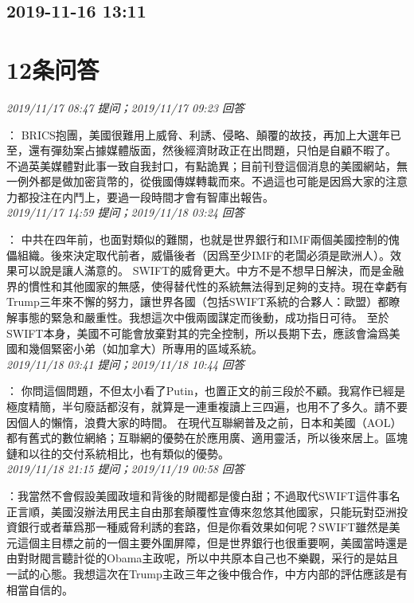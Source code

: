 \documentclass[twocolumn]{ctexart}
\begin{document}
\subsection{2019-11-16 13:11}


\section{12条问答}

\textit{\hfill\noindent\small 2019/11/17 08:47 提问；2019/11/17 09:23 回答}

：
BRICS抱團，美國很難用上威脅、利誘、侵略、顛覆的故技，再加上大選年已至，還有彈劾案占據媒體版面，然後經濟財政正在出問題，只怕是自顧不暇了。 
不過英美媒體對此事一致自我封口，有點詭異；目前刊登這個消息的美國網站，無一例外都是做加密貨幣的，從俄國傳媒轉載而來。不過這也可能是因爲大家的注意力都投注在内鬥上，要過一段時間才會有智庫出報告。
\\

\textit{\hfill\noindent\small 2019/11/17 14:59 提问；2019/11/18 03:24 回答}

：
中共在四年前，也面對類似的難關，也就是世界銀行和IMF兩個美國控制的傀儡組織。後來決定取代前者，威懾後者（因爲至少IMF的老闆必須是歐洲人）。效果可以說是讓人滿意的。 
SWIFT的威脅更大。中方不是不想早日解決，而是金融界的慣性和其他國家的無感，使得替代性的系統無法得到足夠的支持。現在幸虧有Trump三年來不懈的努力，讓世界各國（包括SWIFT系統的合夥人：歐盟）都瞭解事態的緊急和嚴重性。我想這次中俄兩國謀定而後動，成功指日可待。 
至於SWIFT本身，美國不可能會放棄對其的完全控制，所以長期下去，應該會淪爲美國和幾個緊密小弟（如加拿大）所專用的區域系統。
\\

\textit{\hfill\noindent\small 2019/11/18 03:41 提问；2019/11/18 10:44 回答}

：
你問這個問題，不但太小看了Putin，也置正文的前三段於不顧。我寫作已經是極度精簡，半句廢話都沒有，就算是一連重複讀上三四遍，也用不了多久。請不要因個人的懶惰，浪費大家的時間。 
在現代互聯網普及之前，日本和美國（AOL）都有舊式的數位網絡；互聯網的優勢在於應用廣、適用靈活，所以後來居上。區塊鏈和以往的交付系統相比，也有類似的優勢。
\\

\textit{\hfill\noindent\small 2019/11/18 21:15 提问；2019/11/19 00:58 回答}

：我當然不會假設美國政壇和背後的財閥都是傻白甜；不過取代SWIFT這件事名正言順，美國沒辦法用民主自由那套顛覆性宣傳來忽悠其他國家，只能玩對亞洲投資銀行或者華爲那一種威脅利誘的套路，但是你看效果如何呢？SWIFT雖然是美元這個主目標之前的一個主要外圍屏障，但是世界銀行也很重要啊，美國當時還是由對財閥言聽計從的Obama主政呢，所以中共原本自己也不樂觀，采行的是姑且一試的心態。我想這次在Trump主政三年之後中俄合作，中方内部的評估應該是有相當自信的。
\\
\end{document}
